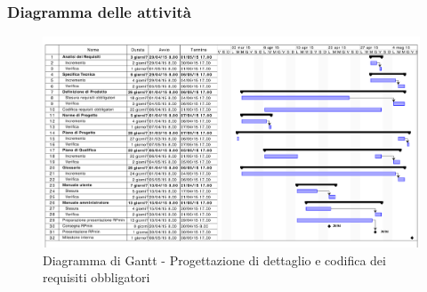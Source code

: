 		\subsubsection{Diagramma delle attività} %
		\label{ssub:diagramma_delle_attivita}
			\begin{figure}[htbp]
				\centering
				\centerline{\includegraphics[scale=0.7]{images/d_attivita_prog_dett_cod_obbl.pdf}}
				\caption{Diagramma di Gantt - Progettazione di dettaglio e codifica dei requisiti obbligatori}
				\label{fig:gantt_prog_dett_cod_requisiti_obbligatori}				
			\end{figure}
	
